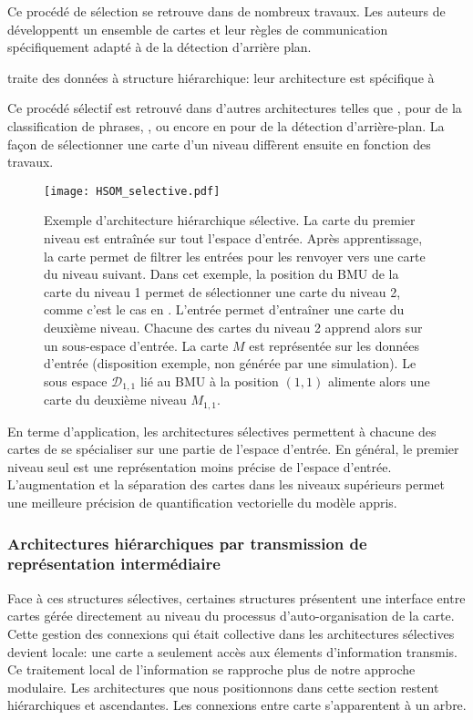 \documentclass[../main]{subfiles}
\begin{document}
Ce procédé de sélection se retrouve dans de nombreux travaux. Les auteurs de \cite{zhao_stacked_2015} développentt un ensemble de cartes et leur règles de communication spécifiquement adapté à de la détection d'arrière plan.

\cite{miikkulainen_script_1992} traite des données à structure hiérarchique: leur architecture est spécifique à

Ce procédé sélectif est retrouvé dans d'autres architectures telles que \cite{suganthan_pattern_2001}, \cite{miikkulainen_script_1992} pour de la classification de phrases, \cite{dittenbach_growing_2000,ordonez_hierarchical_2010}, ou encore en \cite{zhao_stacked_2015} pour de la détection d'arrière-plan. La façon de sélectionner une carte d'un niveau diffèrent ensuite en fonction des travaux. 

\begin{figure}
    \texttt{[image: HSOM\_selective.pdf]}
    \caption{Exemple d'architecture hiérarchique sélective. La carte du premier niveau est entraînée sur tout l'espace d'entrée. Après apprentissage, la carte permet de filtrer les entrées pour les renvoyer vers une carte du niveau suivant. Dans cet exemple, la position du BMU de la carte du niveau 1 permet de sélectionner une carte du niveau 2, comme c'est le cas en \cite{barbalho_hierarchical_2001}. 
    L'entrée permet d'entraîner une carte du deuxième niveau. Chacune des cartes du niveau 2 apprend alors sur un sous-espace d'entrée. La carte $M$ est représentée sur les données d'entrée (disposition exemple, non générée par une simulation). Le sous espace $\mathcal{D}_{1,1}$ lié au BMU à la position $(1,1)$ alimente alors une carte du deuxième niveau $M_{1,1}$.
    \label{fig:hsom_selective}}
\end{figure}

En terme d'application, les architectures sélectives permettent à chacune des cartes de se spécialiser sur une partie de l'espace d'entrée. 
En général, le premier niveau seul est une représentation moins précise de l'espace d'entrée. L'augmentation et la séparation des cartes dans les niveaux supérieurs permet une meilleure précision de quantification vectorielle du modèle appris.

\subsubsection{Architectures hiérarchiques par transmission de représentation intermédiaire}

Face à ces structures sélectives, certaines structures présentent une interface entre cartes gérée directement au niveau du processus d'auto-organisation de la carte.
Cette gestion des connexions qui était collective dans les architectures sélectives devient locale: une carte a seulement accès aux élements d'information transmis. Ce traitement local de l'information se rapproche plus de notre approche modulaire.
Les architectures que nous positionnons dans cette section restent hiérarchiques et ascendantes. Les connexions entre carte s'apparentent à un arbre.
\end{document}
